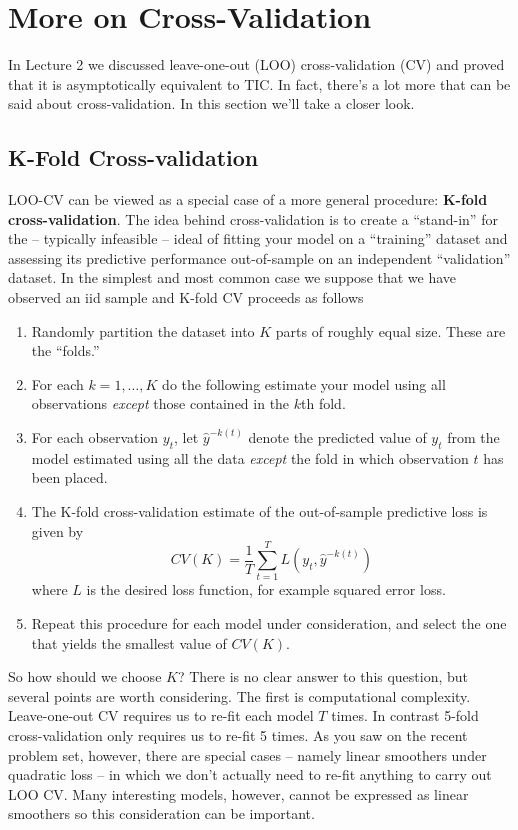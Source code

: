 \documentclass[12pt]{article}
\theoremstyle{definition}
\begin{document}
\section{More on Cross-Validation}
In Lecture 2 we discussed leave-one-out (LOO) cross-validation (CV) and proved that it is asymptotically equivalent to TIC. In fact, there's a lot more that can be said about cross-validation. In this section we'll take a closer look.

\subsection{K-Fold Cross-validation}
LOO-CV can be viewed as a special case of a more general procedure: \textbf{K-fold cross-validation}. The idea behind cross-validation is to create a ``stand-in'' for the -- typically infeasible -- ideal of fitting your model on a ``training'' dataset and assessing its predictive performance out-of-sample on an independent ``validation'' dataset. In the simplest and most common case we suppose that we have observed an iid sample and K-fold CV proceeds as follows
	\begin{enumerate}
		\item Randomly partition the dataset into $K$ parts of roughly equal size. These are the ``folds.''
		\item For each $k = 1, \hdots, K$ do the following estimate your model using all observations \emph{except} those contained in the $k$th fold. 
		\item For each observation $y_t$, let $\widehat{y}^{-k(t)}$ denote the predicted value of $y_t$ from the model estimated using all the data \emph{except} the fold in which observation $t$ has been placed.
		\item The K-fold cross-validation estimate of the out-of-sample predictive loss is given by
			$$CV(K) = \frac{1}{T}\sum_{t=1}^T L\left(y_t, \widehat{y}^{-k(t)}\right)$$
		where $L$ is the desired loss function, for example squared error loss.
		\item Repeat this procedure for each model under consideration, and select the one that yields the smallest value of $CV(K)$.
	\end{enumerate}

So how should we choose $K$? There is no clear answer to this question, but several points are worth considering. The first is computational complexity. Leave-one-out CV requires us to re-fit each model $T$ times. In contrast 5-fold cross-validation only requires us to re-fit 5 times. As you saw on the recent problem set, however, there are special cases -- namely linear smoothers under quadratic loss -- in which we don't actually need to re-fit anything to carry out LOO CV. Many interesting models, however, cannot be expressed as linear smoothers so this consideration can be important. 
\end{document}
